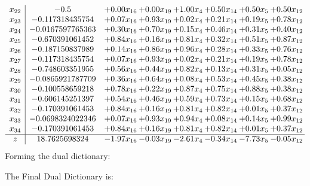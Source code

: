 \documentclass[8pt]{article}
\begin{document}
\[\begin{array}{c| c c@{\hskip 2pt} c@{\hskip 2pt} c@{\hskip 2pt} c@{\hskip 2pt} c@{\hskip 2pt} c@{\hskip 2pt} }
 x_{22}   &  -0.5 & +  0.00 x_{16} & +  0.00 x_{19} & +  1.00 x_{4} & +  0.50 x_{14} & +  0.50 x_{5} & +  0.50 x_{12}\\
 x_{23}   &  -0.117318435754 & +  0.07 x_{16} & +  0.93 x_{19} & +  0.02 x_{4} & +  0.21 x_{14} & +  0.19 x_{5} & +  0.78 x_{12}\\
 x_{24}   &  -0.0167597765363 & +  0.30 x_{16} & +  0.70 x_{19} & +  0.15 x_{4} & +  0.46 x_{14} & +  0.31 x_{5} & +  0.40 x_{12}\\
 x_{25}   &  -0.670391061452 & +  0.84 x_{16} & +  0.16 x_{19} & +  0.81 x_{4} & +  0.32 x_{14} & +  0.51 x_{5} & +  0.87 x_{12}\\
 x_{26}   &  -0.187150837989 & +  0.14 x_{16} & +  0.86 x_{19} & +  0.96 x_{4} & +  0.28 x_{14} & +  0.33 x_{5} & +  0.76 x_{12}\\
 x_{27}   &  -0.117318435754 & +  0.07 x_{16} & +  0.93 x_{19} & +  0.02 x_{4} & +  0.21 x_{14} & +  0.19 x_{5} & +  0.78 x_{12}\\
 x_{28}   &  -0.748603351955 & +  0.56 x_{16} & +  0.44 x_{19} & +  0.82 x_{4} & +  0.13 x_{14} & +  0.31 x_{5} & +  0.05 x_{12}\\
 x_{29}   &  -0.0865921787709 & +  0.36 x_{16} & +  0.64 x_{19} & +  0.08 x_{4} & +  0.53 x_{14} & +  0.45 x_{5} & +  0.38 x_{12}\\
 x_{30}   &  -0.100558659218 & +  0.78 x_{16} & +  0.22 x_{19} & +  0.87 x_{4} & +  0.75 x_{14} & +  0.88 x_{5} & +  0.38 x_{12}\\
 x_{31}   &  -0.606145251397 & +  0.54 x_{16} & +  0.46 x_{19} & +  0.59 x_{4} & +  0.73 x_{14} & +  0.15 x_{5} & +  0.68 x_{12}\\
 x_{32}   &  -0.170391061453 & +  0.84 x_{16} & +  0.16 x_{19} & +  0.81 x_{4} & +  0.82 x_{14} & +  0.01 x_{5} & +  0.37 x_{12}\\
 x_{33}   &  -0.0698324022346 & +  0.07 x_{16} & +  0.93 x_{19} & +  0.94 x_{4} & +  0.08 x_{14} & +  0.14 x_{5} & +  0.99 x_{12}\\
 x_{34}   &  -0.170391061453 & +  0.84 x_{16} & +  0.16 x_{19} & +  0.81 x_{4} & +  0.82 x_{14} & +  0.01 x_{5} & +  0.37 x_{12}\\
\hline
z    &  18.7625698324 & -1.97 x_{16} & -0.03 x_{19} & -2.61 x_{4} & -0.34 x_{14} & -7.73 x_{5} & -0.05 x_{12}\\
\end{array}\]
Forming the dual dictionary:

The Final Dual Dictionary is: 
\end{document}
